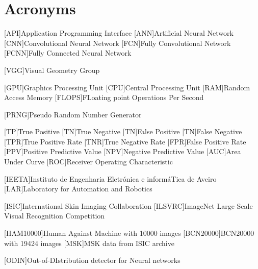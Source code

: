 \chapter{Acronyms}

\footnotesize
\SingleSpacing

\begin{multicols}{2}
\begin{acronym}[AAAAAA]

    [API]{Application Programming Interface}
	[ANN]{Artificial Neural Network}
	[CNN]{Convolutional Neural Network}
    [FCN]{Fully Convolutional Network}
	[FCNN]{Fully Connected Neural Network}

	[VGG]{Visual Geometry Group}

    [GPU]{Graphics Processing Unit}
	[CPU]{Central Processing Unit}
	[RAM]{Random Access Memory}
    [FLOPS]{FLoating point Operations Per Second}
	
	[PRNG]{Pseudo Random Number Generator}

    [TP]{True Positive}
    [TN]{True Negative}
    [TN]{False Positive}
    [TN]{False Negative}
    [TPR]{True Positive Rate}
    [TNR]{True Negative Rate}
    [FPR]{False Positive Rate}
    [PPV]{Positive Predictive Value}
    [NPV]{Negative Predictive Value}
    [AUC]{Area Under Curve}
    [ROC]{Receiver Operating Characteristic}

    [IEETA]{Instituto de Engenharia Eletrónica e informáTica de Aveiro}
    [LAR]{Laboratory for Automation and Robotics}
    
    [ISIC]{International Skin Imaging Collaboration}
    [ILSVRC]{ImageNet Large Scale Visual Recognition Competition}
    
    [HAM10000]{Human Against Machine with 10000 images}
    [BCN20000]{BCN20000 with 19424 images}
    [MSK]{MSK data from ISIC archive}

	[ODIN]{Out-of-DIstribution detector for Neural networks}

\end{acronym}
\end{multicols}

